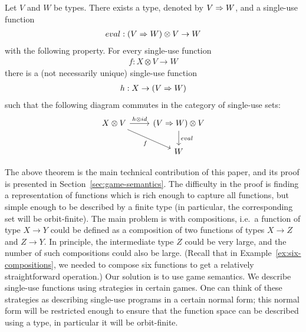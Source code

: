 \begin{theorem}\label{thm:single-use-closed}
    Let $V$ and $W$ be types. There exists a type, denoted by  $V \Rightarrow W$, and a single-use function 
    \begin{align*}
    eval : (V \Rightarrow W) \otimes V \to  W
    \end{align*}
    with the following property. For every single-use function
    \begin{align*}
    f : {X \otimes V} \to  W
    \end{align*}
    there is a (not necessarily unique) single-use function 
    \begin{align*}
    h :  X \to (V \Rightarrow W)
    \end{align*}
    such that the following diagram commutes in the category of single-use sets:
    \[
    \begin{tikzcd}
    X \otimes V 
    \arrow[r,"h \otimes id"]
    \arrow[dr,"f"']
    &
    (\funspace V W) \otimes V
    \arrow[d,"eval"] \\
    &
    W
    \end{tikzcd}
    \]
\end{theorem}

The above theorem is the main technical contribution of this paper, and its proof is presented in Section~\ref{sec:game-semantics}. The difficulty in the proof is finding a representation of functions which is rich enough to capture all functions, but simple enough to be described by a finite type (in particular, the corresponding set will be orbit-finite). The main problem is with compositions, i.e.~a function of type $X \to Y$ could be defined as a composition of two functions of types $X \to Z$ and $Z \to Y$. In principle, the intermediate type $Z$ could  be very large, and the number of such compositions could also be large. (Recall that in Example~\ref{ex:six-compositions}, we needed to compose six functions to get a relatively straightforward operation.) Our solution is to use game semantics. We describe single-use functions using strategies in certain games. One can think of these strategies as describing single-use programs in a certain normal form; this normal form will be restricted enough to ensure that the function space can be described using a type, in particular it will be orbit-finite. 








